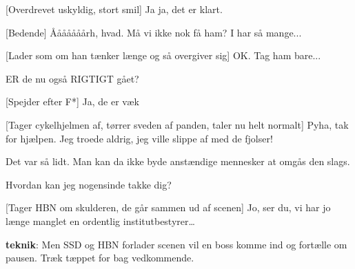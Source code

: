 \documentclass[a4paper,11pt]{article}
\begin{document}
\begin{sketch}
   [Overdrevet uskyldig, stort smil] Ja ja, det er klart.
  
   [Bedende] Ååååååårh, hvad. Må vi ikke nok få ham? I har så
  mange...
  
   [Lader som om han tænker længe og så overgiver sig] OK.
  Tag ham bare... 
  
  
   ER de nu også RIGTIGT gået?
  
   [Spejder efter F*] Ja, de er væk
  
   [Tager cykelhjelmen af, tørrer sveden af panden, taler nu
  helt normalt] Pyha, tak for hjælpen. Jeg troede aldrig, jeg ville
  slippe af med de fjolser!
  
   Det var så lidt. Man kan da ikke byde anstændige
  mennesker at omgås den slags.
  
   Hvordan kan jeg nogensinde takke dig?
  
   [Tager HBN om skulderen, de går sammen ud af scenen] Jo,
  ser du, vi har jo længe manglet en ordentlig institutbestyrer\ldots
  
  \scene \textbf{teknik}: Men SSD og HBN forlader scenen vil en boss
  komme ind og fortælle om pausen. Træk tæppet for bag vedkommende.

\end{sketch}
\end{document}
